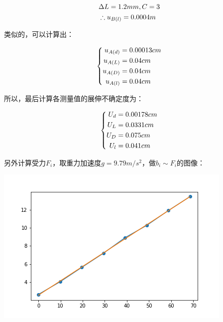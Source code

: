 \documentclass[a4paper]{ltxdoc}
\newenvironment{Figure}
  {\par\medskip\noindent\minipage{\linewidth}}
  {\endminipage\par\medskip}
\begin{document}
\begin{multicols}{2}
    \begin{equation}
        \begin{aligned}
             & \Delta L             = 1.2mm,C=3 \\
             & \therefore u_{B(l)}  = 0.0004m   \\
        \end{aligned}
        \notag
    \end{equation}

    类似的，可以计算出：

    \begin{equation}
        \left\{
        \begin{aligned}
            u_{A(d)} & = 0.00013cm \\
            u_{A(L)} & = 0.04cm    \\
            u_{A(D)} & = 0.04cm    \\
            u_{A(l)} & = 0.04cm    \\
        \end{aligned}
        \right.
        \notag
    \end{equation}

    所以，最后计算各测量值的展伸不确定度为：

    \begin{equation}
        \left\{
        \begin{aligned}
            U_{d} & = 0.00178cm \\
            U_{L} & = 0.0331cm  \\
            U_{D} & = 0.075cm   \\
            U_{l} & = 0.041cm   \\
        \end{aligned}
        \right.
        \notag
    \end{equation}

    另外计算受力$F_i$，取重力加速度$g=9.79m/s^2$，做$b_i \sim F_i$的图像：

    \begin{Figure}
        \centering
        \includegraphics[width=\linewidth]{img/2.png}
    \end{Figure}


\end{multicols}
\end{document}
